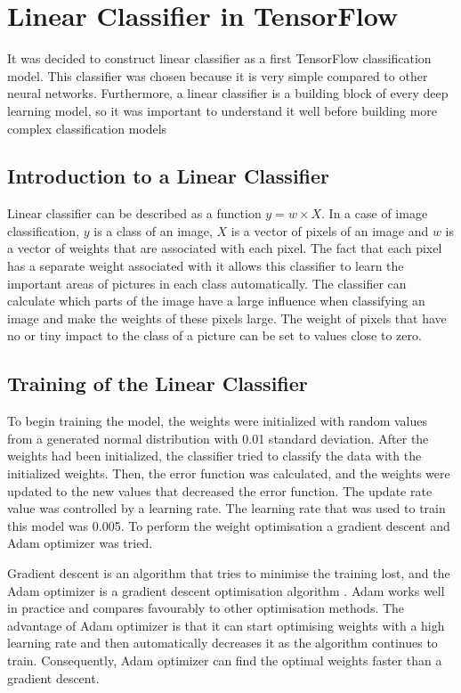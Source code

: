\section{Linear Classifier in TensorFlow}
It was decided to construct linear classifier as a first TensorFlow classification model. This classifier was chosen because it is very simple compared to other neural networks. Furthermore, a linear classifier is a building block of every deep learning model, so it was  important to understand it well before building more complex classification models

\subsection{Introduction to a Linear Classifier}
 Linear classifier can be described as a function \(y = w\times X\). In a case of image classification, \(y\) is a class of an image, \(X\) is a vector of pixels of an image and  \(w\) is a vector of weights that are associated with each pixel. The fact that each pixel has a separate weight associated with it allows this classifier to learn the important areas of pictures in each class automatically. The classifier can calculate which parts of the image have a large influence when classifying an image and make the weights of these pixels large. The weight of pixels that have no or tiny impact to the class of a picture can be set to values close to zero.

\subsection{Training  of  the Linear Classifier}
To begin training the model, the weights were initialized with random values from a generated normal distribution with 0.01 standard deviation. After the weights had been initialized, the classifier tried to classify the data with the initialized weights. Then, the error function was calculated, and the weights were updated to the new values that decreased the error function. The update rate value was controlled by a learning rate. The learning rate that was used to train this model was 0.005. To perform the weight optimisation a gradient descent and Adam optimizer was tried.

Gradient descent is an algorithm that tries to minimise the training lost, and the Adam optimizer is a gradient descent optimisation algorithm \cite{adam}. Adam works well in practice and compares favourably to other optimisation methods. The advantage of Adam optimizer is that it can start optimising weights with a high learning rate and then automatically decreases it as the algorithm continues to train. Consequently, Adam optimizer can find the optimal weights faster than a gradient descent.

